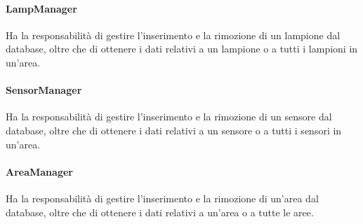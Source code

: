 \paragraph{LampManager}

Ha la responsabilità di gestire l'inserimento e la rimozione di un lampione dal database, oltre che di ottenere i dati relativi a un lampione o a tutti i lampioni in un'area.

\paragraph{SensorManager}

Ha la responsabilità di gestire l'inserimento e la rimozione di un sensore dal database, oltre che di ottenere i dati relativi a un sensore o a tutti i sensori in un'area.

\paragraph{AreaManager}
Ha la responsabilità di gestire l'inserimento e la rimozione di un'area dal database, oltre che di ottenere i dati relativi a un'area o a tutte le aree.
